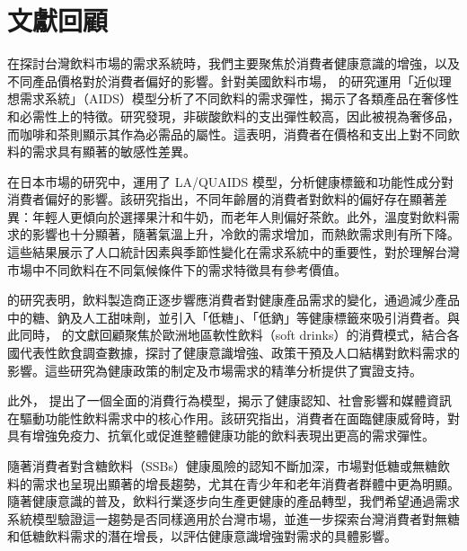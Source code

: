 \section{文獻回顧}

在探討台灣飲料市場的需求系統時，我們主要聚焦於消費者健康意識的增強，以及不同產品價格對於消費者偏好的影響。針對美國飲料市場，\citet{RN2} 的研究運用「近似理想需求系統」（AIDS）模型分析了不同飲料的需求彈性，揭示了各類產品在奢侈性和必需性上的特徵。研究發現，非碳酸飲料的支出彈性較高，因此被視為奢侈品，而咖啡和茶則顯示其作為必需品的屬性。這表明，消費者在價格和支出上對不同飲料的需求具有顯著的敏感性差異。

\citet{RN1} 在日本市場的研究中，運用了 LA/QUAIDS 模型，分析健康標籤和功能性成分對消費者偏好的影響。該研究指出，不同年齡層的消費者對飲料的偏好存在顯著差異：年輕人更傾向於選擇果汁和牛奶，而老年人則偏好茶飲。此外，溫度對飲料需求的影響也十分顯著，隨著氣溫上升，冷飲的需求增加，而熱飲需求則有所下降。這些結果展示了人口統計因素與季節性變化在需求系統中的重要性，對於理解台灣市場中不同飲料在不同氣候條件下的需求特徵具有參考價值。

\citet{RN9} 的研究表明，飲料製造商正逐步響應消費者對健康產品需求的變化，通過減少產品中的糖、鈉及人工甜味劑，並引入「低糖」、「低鈉」等健康標籤來吸引消費者。與此同時，\citet{RN3} 的文獻回顧聚焦於歐洲地區軟性飲料（soft drinks）的消費模式，結合各國代表性飲食調查數據，探討了健康意識增強、政策干預及人口結構對飲料需求的影響。這些研究為健康政策的制定及市場需求的精準分析提供了實證支持。

此外，\citet{Rn15} 提出了一個全面的消費行為模型，揭示了健康認知、社會影響和媒體資訊在驅動功能性飲料需求中的核心作用。該研究指出，消費者在面臨健康威脅時，對具有增強免疫力、抗氧化或促進整體健康功能的飲料表現出更高的需求彈性。

隨著消費者對含糖飲料（SSBs）健康風險的認知不斷加深，市場對低糖或無糖飲料的需求也呈現出顯著的增長趨勢，尤其在青少年和老年消費者群體中更為明顯\citep{RN3}。隨著健康意識的普及，飲料行業逐步向生產更健康的產品轉型，我們希望通過需求系統模型驗證這一趨勢是否同樣適用於台灣市場，並進一步探索台灣消費者對無糖和低糖飲料需求的潛在增長，以評估健康意識增強對需求的具體影響。
 